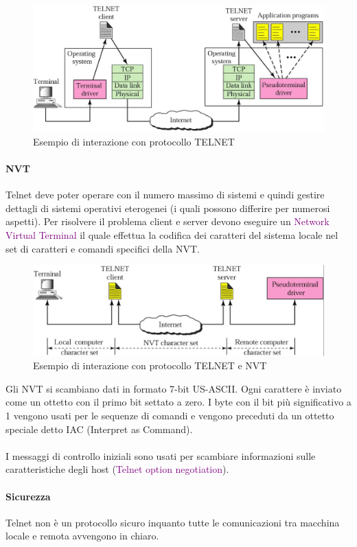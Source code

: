 \begin{figure}[h]
    \centering
    \includegraphics[scale=0.27]{Immagini/Schema_Telnet.png}
    \caption{Esempio di interazione con protocollo TELNET}
\end{figure}

\newblock

\paragraph{NVT} Telnet deve poter operare con il numero massimo di sistemi e quindi gestire dettagli di sistemi operativi eterogenei (i quali possono differire per numerosi aspetti).
Per risolvere il problema client e server devono eseguire un \textcolor{purple}{Network Virtual Terminal} il quale effettua la codifica dei caratteri del sistema locale nel set di caratteri e comandi specifici della NVT.
\begin{figure}[h]
    \centering
    \includegraphics[scale=0.27]{Immagini/Telnet_NVT.png}
    \caption{Esempio di interazione con protocollo TELNET e NVT}
\end{figure}

Gli NVT si scambiano dati in formato 7-bit US-ASCII. Ogni carattere è inviato come un ottetto con il primo bit settato a zero.
I byte con il bit più significativo a 1 vengono usati per le sequenze di comandi e vengono preceduti da un ottetto speciale detto IAC (Interpret as Command).
\\ \\ I messaggi di controllo iniziali sono usati per scambiare informazioni sulle caratteristiche degli host (\textcolor{purple}{Telnet option negotiation}).

\paragraph{Sicurezza} Telnet non è un protocollo sicuro inquanto tutte le comunicazioni tra macchina locale e remota avvengono in chiaro.
\newpage